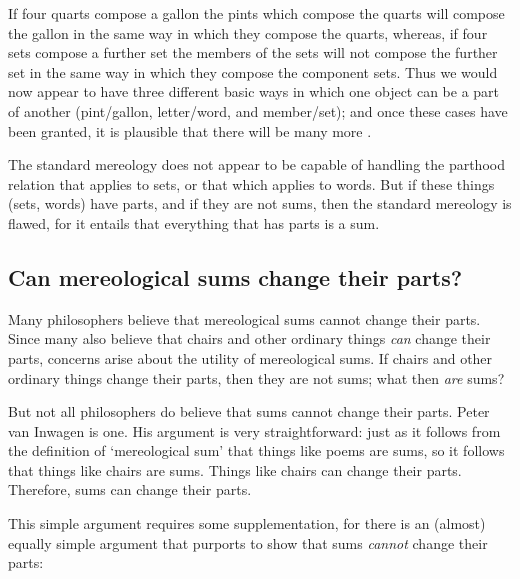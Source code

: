 \documentclass[11pt]{article}
\newenvironment{squote}{%
\begin{spacing}{1}
\begin{list}{}{%
\setlength{\labelwidth}{0pt}%
\rightmargin\leftmargin%
}
\item\relax
}{%
\end{list}%
\end{spacing}
}
\begin{document}
\begin{spacing}{1.5}
\begin{squote}
If four quarts compose a gallon the pints which compose the quarts
will compose the gallon in the same way in which they compose the
quarts, whereas, if four sets compose a further set the members of the
sets will not compose the further set in the same way in which they
compose the component sets.  Thus we would now appear to have three
different basic ways in which one object can be a part of another
(pint/gallon, letter/word, and member/set); and once these cases have
been granted, it is plausible that there will be many more
\citep[562]{fine2010}.
\end{squote}

The standard mereology does not appear to be capable of handling the
parthood relation that applies to sets, or that which applies to
words.  But if these things (sets, words) have parts, and if they are
not sums, then the standard mereology is flawed, for it entails that
everything that has parts is a sum.

\subsection{Can mereological sums change their parts?}
\label{change}
Many philosophers believe that mereological sums cannot change their
parts.  Since many also believe that chairs and other ordinary things
{\em can} change their parts, concerns arise about the utility of
mereological sums.  If chairs and other ordinary things change their
parts, then they are not sums; what then {\em are} sums?

But not all philosophers do believe that sums cannot change their
parts.  Peter van Inwagen is one.  His argument is very
straightforward:  just as it follows from the definition of
`mereological sum' that things like poems are sums, so it follows that
things like chairs are sums.  Things like chairs can change their
parts.  Therefore, sums can change their parts.

This simple argument requires some supplementation, for there is an
(almost) equally simple argument that purports to show that sums {\em
  cannot} change their parts:


\end{spacing}
\end{document}
